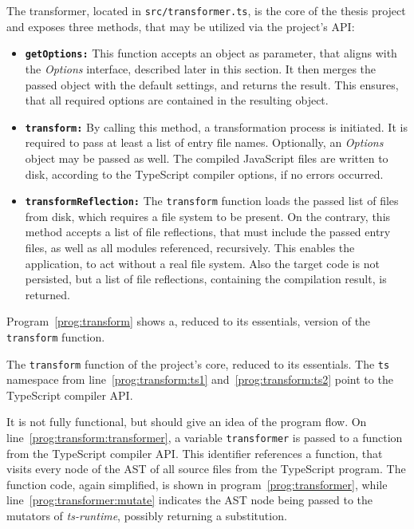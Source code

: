 The transformer, located in \texttt{src/transformer.ts}, is the core of the thesis project and exposes three methods, that may be utilized via the project's API:
\begin{itemize}
  \item \texttt{\textbf{getOptions:}} This function accepts an object as parameter, that aligns with the \emph{Options} interface, described later in this section. It then merges the passed object with the default settings, and returns the result. This ensures, that all required options are contained in the resulting object.
  \item \texttt{\textbf{transform:}} By calling this method, a transformation process is initiated. It is required to pass at least a list of entry file names. Optionally, an \emph{Options} object may be passed as well. The compiled JavaScript files are written to disk, according to the TypeScript compiler options, if no errors occurred.
  \item \texttt{\textbf{transformReflection:}} The \texttt{transform} function loads the passed list of files from disk, which requires a file system to be present. On the contrary, this method accepts a list of file reflections, that must include the passed entry files, as well as all modules referenced, recursively. This enables the application, to act without a real file system. Also the target code is not persisted, but a list of file reflections, containing the compilation result, is returned.
\end{itemize}
Program~\ref{prog:transform} shows a, reduced to its essentials, version of the \texttt{transform} function.
\begin{program}
\caption{The \texttt{transform} function of the project's core, reduced to its essentials. The \texttt{ts} namespace from line~\ref{prog:transform:ts1} and~\ref{prog:transform:ts2} point to the TypeScript compiler API.}
\label{prog:transform}
\begin{JsCode}
function transform(entryFiles: string[], options?: Options} {
  const opts = getOptions(options);
  const program = ts.createProgram(entryFiles, opts.compilerOptions); /+\label{prog:transform:ts1}+/
  const scanner = new Scanner(program, opts);
  const files = program.getSourceFiles();
  const result = ts.transform(files, [transformer], opts.compilerOptions); /+\label{prog:transform:ts2}+/ /+\label{prog:transform:transformer}+/
  emit(result);
}
\end{JsCode}
\end{program}
It is not fully functional, but should give an idea of the program flow. On line~\ref{prog:transform:transformer}, a variable \texttt{transformer} is passed to a function from the TypeScript compiler API. This identifier references a function, that visits every node of the AST of all source files from the TypeScript program. The function code, again simplified, is shown in program~\ref{prog:transformer}, while line~\ref{prog:transformer:mutate} indicates the AST node being passed to the mutators of \emph{ts-runtime}, possibly returning a substitution.
